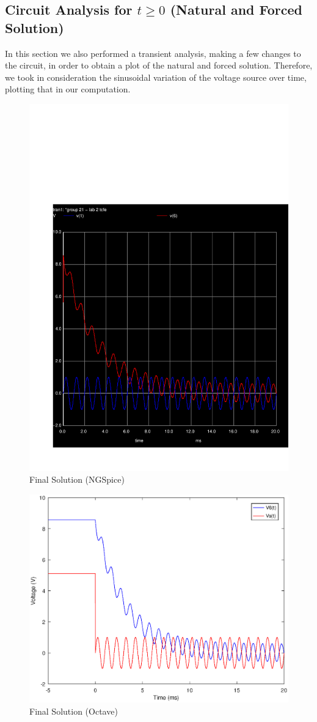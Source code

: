 \subsection{Circuit Analysis for $t \geq 0 $ (Natural and Forced Solution)}

In this section we also performed a transient analysis, making a few changes to the circuit, in order to obtain a plot of the natural and forced solution. Therefore, we took in consideration the sinusoidal variation of the voltage source over time, plotting that in our computation.

\begin{figure}[h] \centering
\includegraphics[width=0.7\linewidth]{question_4.pdf}
\caption{Final Solution (NGSpice)}
\label{fig:snat}
\end{figure}

\begin{figure}[h] \centering
\includegraphics[width=0.7\linewidth]{forced_and_natural_solution.eps}
\caption{Final Solution (Octave)}
\label{fig:snat}
\end{figure}

